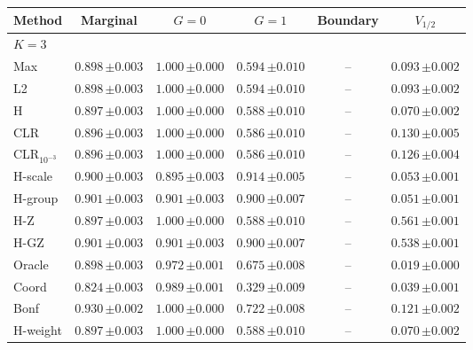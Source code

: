 \begin{tabular}{lccccc}\toprule
Method & Marginal & $G=0$ & $G=1$ & Boundary & $V_{1/2}$ \\\midrule
\multicolumn{6}{l}{$K=3$} \\
Max & $0.898\,{\scriptstyle\pm 0.003}$ & $1.000\,{\scriptstyle\pm 0.000}$ & $0.594\,{\scriptstyle\pm 0.010}$ & -- & $0.093\,{\scriptstyle\pm 0.002}$ \\
L2 & $0.898\,{\scriptstyle\pm 0.003}$ & $1.000\,{\scriptstyle\pm 0.000}$ & $0.594\,{\scriptstyle\pm 0.010}$ & -- & $0.093\,{\scriptstyle\pm 0.002}$ \\
H & $0.897\,{\scriptstyle\pm 0.003}$ & $1.000\,{\scriptstyle\pm 0.000}$ & $0.588\,{\scriptstyle\pm 0.010}$ & -- & $0.070\,{\scriptstyle\pm 0.002}$ \\
CLR & $0.896\,{\scriptstyle\pm 0.003}$ & $1.000\,{\scriptstyle\pm 0.000}$ & $0.586\,{\scriptstyle\pm 0.010}$ & -- & $0.130\,{\scriptstyle\pm 0.005}$ \\
CLR$_{10^{-3}}$ & $0.896\,{\scriptstyle\pm 0.003}$ & $1.000\,{\scriptstyle\pm 0.000}$ & $0.586\,{\scriptstyle\pm 0.010}$ & -- & $0.126\,{\scriptstyle\pm 0.004}$ \\
H-scale & $0.900\,{\scriptstyle\pm 0.003}$ & $0.895\,{\scriptstyle\pm 0.003}$ & $0.914\,{\scriptstyle\pm 0.005}$ & -- & $0.053\,{\scriptstyle\pm 0.001}$ \\
H-group & $0.901\,{\scriptstyle\pm 0.003}$ & $0.901\,{\scriptstyle\pm 0.003}$ & $0.900\,{\scriptstyle\pm 0.007}$ & -- & $0.051\,{\scriptstyle\pm 0.001}$ \\
H-Z & $0.897\,{\scriptstyle\pm 0.003}$ & $1.000\,{\scriptstyle\pm 0.000}$ & $0.588\,{\scriptstyle\pm 0.010}$ & -- & $0.561\,{\scriptstyle\pm 0.001}$ \\
H-GZ & $0.901\,{\scriptstyle\pm 0.003}$ & $0.901\,{\scriptstyle\pm 0.003}$ & $0.900\,{\scriptstyle\pm 0.007}$ & -- & $0.538\,{\scriptstyle\pm 0.001}$ \\
Oracle & $0.898\,{\scriptstyle\pm 0.003}$ & $0.972\,{\scriptstyle\pm 0.001}$ & $0.675\,{\scriptstyle\pm 0.008}$ & -- & $0.019\,{\scriptstyle\pm 0.000}$ \\
Coord & $0.824\,{\scriptstyle\pm 0.003}$ & $0.989\,{\scriptstyle\pm 0.001}$ & $0.329\,{\scriptstyle\pm 0.009}$ & -- & $0.039\,{\scriptstyle\pm 0.001}$ \\
Bonf & $0.930\,{\scriptstyle\pm 0.002}$ & $1.000\,{\scriptstyle\pm 0.000}$ & $0.722\,{\scriptstyle\pm 0.008}$ & -- & $0.121\,{\scriptstyle\pm 0.002}$ \\
H-weight & $0.897\,{\scriptstyle\pm 0.003}$ & $1.000\,{\scriptstyle\pm 0.000}$ & $0.588\,{\scriptstyle\pm 0.010}$ & -- & $0.070\,{\scriptstyle\pm 0.002}$ \\

\end{tabular}

